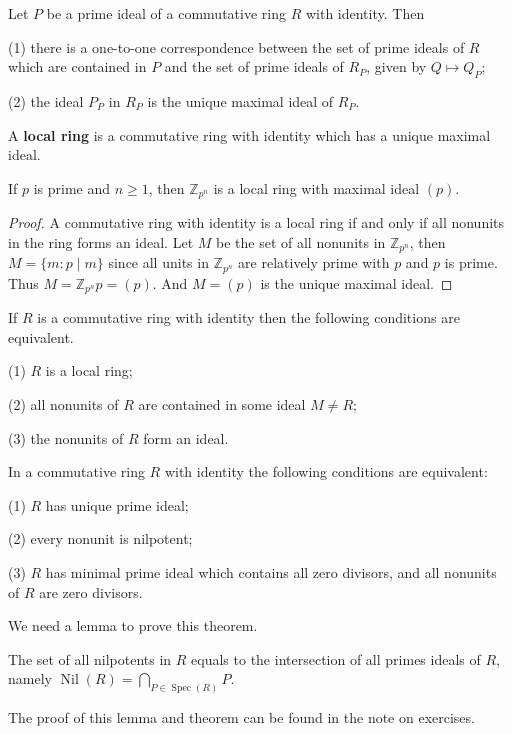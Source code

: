 \documentclass{article}
\DeclareMathOperator{\nil}{Nil}
\DeclareMathOperator{\spec}{Spec}
\begin{document}
\begin{theorem}
    Let $P$ be a prime ideal of a commutative ring $R$ with identity. Then 

    (1) there is a one-to-one correspondence between the set of prime ideals of $R$ which are contained in $P$ and the set of prime ideals of $R_P$, given by $Q\mapsto Q_P$;

    (2) the ideal $P_P$ in $R_P$ is the unique maximal ideal of $R_P$.
\end{theorem}

\begin{definition}
    A \textbf{local ring} is a commutative ring with identity which has a unique maximal ideal.
\end{definition}

\begin{example}
    If $p$ is prime and $n\geqslant 1$, then $\mathbb{Z}_{p^n}$ is a local ring with maximal ideal $(p)$.
\end{example}
\begin{proof}
    A commutative ring with identity is a local ring if and only if all nonunits in the ring forms an ideal. Let $M$ be the set of all nonunits in $\mathbb{Z}_{p^n}$, then $M=\{m: p\mid m\}$ since all units in $\mathbb{Z}_{p^{n}}$ are relatively prime with $p$ and $p$ is prime. Thus $M=\mathbb{Z}_{p^n}p=(p)$. And $M=(p)$ is the unique maximal ideal.
\end{proof}

\begin{theorem}
    If $R$ is a commutative ring with identity then the following conditions are equivalent.

    (1) $R$ is a local ring;

    (2) all nonunits of $R$ are contained in some ideal $M\neq R$;

    (3) the nonunits of $R$ form an ideal.
\end{theorem}

\begin{theorem}
    In a commutative ring $R$ with identity the following conditions are equivalent:

    (1) $R$ has unique prime ideal;

    (2) every nonunit is nilpotent;

    (3) $R$ has minimal prime ideal which contains all zero divisors, and all nonunits of $R$ are zero divisors.
\end{theorem}
We need a lemma to prove this theorem.
\begin{lemma}
    The set of all nilpotents in $R$ equals to the intersection of all primes ideals of $R$, namely $\nil (R)=\bigcap_{P \in \spec(R)}P$.
\end{lemma}
The proof of this lemma and theorem can be found in the note on exercises.
\end{document}
